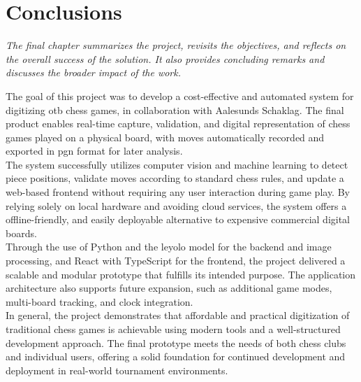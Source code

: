 \chapter{Conclusions}

\begin{center}
    \textit{The final chapter summarizes the project, revisits the objectives, and reflects on the overall success of the solution. It also provides concluding remarks and discusses the broader impact of the work.}
\end{center}

The goal of this project was to develop a cost-effective and automated system for digitizing \gls{otb} chess games, in collaboration with Aalesunds Schaklag. The final product enables real-time capture, validation, and digital representation of chess games played on a physical board, with moves automatically recorded and exported in \gls{pgn} format for later analysis. \\

The system successfully utilizes computer vision and machine learning to detect piece positions, validate moves according to standard chess rules, and update a web-based frontend without requiring any user interaction during game play. By relying solely on local hardware and avoiding cloud services, the system offers a offline-friendly, and easily deployable alternative to expensive commercial digital boards. \\

Through the use of Python and the \gls{leyolo} model for the backend and image processing, and React with TypeScript for the frontend, the project delivered a scalable and modular prototype that fulfills its intended purpose. The application architecture also supports future expansion, such as additional game modes, multi-board tracking, and clock integration. \\

In general, the project demonstrates that affordable and practical digitization of traditional chess games is achievable using modern tools and a well-structured development approach. The final prototype meets the needs of both chess clubs and individual users, offering a solid foundation for continued development and deployment in real-world tournament environments.